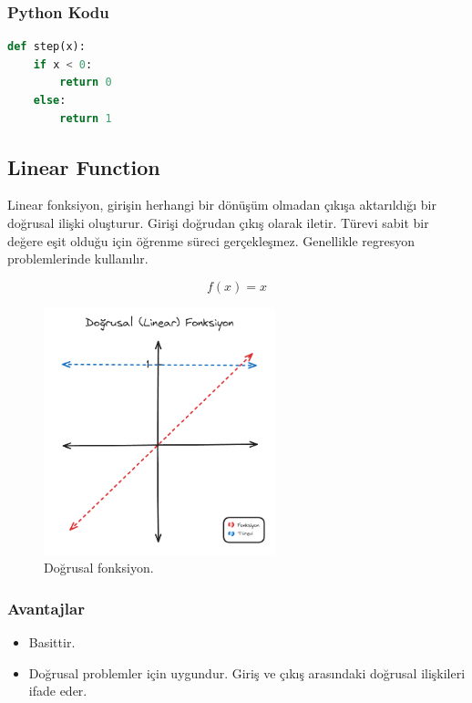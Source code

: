 \subsubsection{Python Kodu}

\begin{lstlisting}[language=Python]
def step(x):
    if x < 0:
        return 0
    else:
        return 1
\end{lstlisting}

\newpage

\subsection{Linear Function}
Linear fonksiyon, girişin herhangi bir dönüşüm olmadan çıkışa aktarıldığı bir doğrusal ilişki oluşturur. Girişi doğrudan çıkış olarak iletir. Türevi sabit bir değere eşit olduğu için öğrenme süreci gerçekleşmez. Genellikle regresyon problemlerinde kullanılır.

\[f(x) = x\]

\begin{figure}[h]
    \centering
    \includegraphics[width=0.6\textwidth]{images/linear_function.png}
    \caption{Doğrusal fonksiyon.}
    \label{fig:enter-label}
\end{figure}

\subsubsection{Avantajlar}
\begin{itemize}
    \item Basittir.
    \item Doğrusal problemler için uygundur. Giriş ve çıkış arasındaki doğrusal ilişkileri ifade eder.
\end{itemize}

